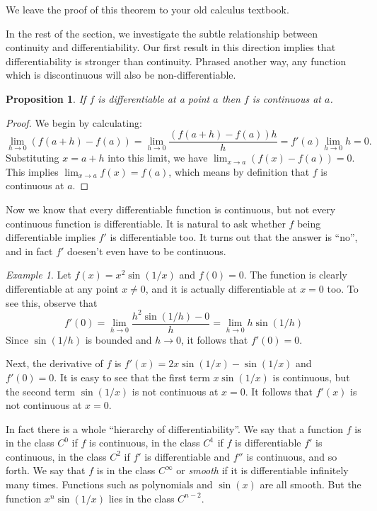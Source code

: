 \documentclass[11pt,oneside]{amsbook}
\theoremstyle{definition}
\theoremstyle{plain}
\newtheorem{proposition}[theorem]{Proposition}
\theoremstyle{definition}
\theoremstyle{remark}
\newtheorem{example}[theorem]{Example}
\numberwithin{equation}{section}
\numberwithin{figure}{section}
\begin{document}
We leave the proof of this theorem to your old calculus textbook.

In the rest of the section, we investigate the subtle relationship between continuity and differentiability. Our first result in this direction implies that differentiability is stronger than continuity. Phrased another way, any function which is discontinuous will also be non-differentiable.

\begin{proposition}
  If $f$ is differentiable at a point $a$ then $f$ is continuous at $a$.
\end{proposition}

\begin{proof}
  We begin by calculating:
  \[\lim_{h\to 0}(f(a+h)-f(a))=\lim_{h\to 0}\frac{(f(a+h)-f(a))h}{h}
    =f'(a)\lim_{h\to 0}h=0\text{.}
  \]
  Substituting $x=a+h$ into this limit, we have $\lim_{x\to a}(f(x)-f(a))=0$. This implies $\lim_{x\to a}f(x)=f(a)$, which means by definition that $f$ is continuous at $a$.
\end{proof}

Now we know that every differentiable function is continuous, but not every continuous function is differentiable. It is natural to ask whether $f$ being differentiable implies $f'$ is differentiable too. It turns out that the answer is ``no'', and in fact $f'$ doesen't even have to be continuous.

\begin{example}
  Let $f(x)=x^2\sin(1/x)$ and $f(0)=0$. The function is clearly differentiable at any point $x\neq0$, and it is actually differentiable at $x=0$ too. To see this, observe that
\[f'(0)=\lim_{h\to0}\frac{h^2\sin(1/h)-0}{h}=\lim_{h\to0}h\sin(1/h)
\]
Since $\sin(1/h)$ is bounded and $h\to 0$, it follows that $f'(0)=0$.

Next, the derivative of $f$ is $f'(x)=2x\sin(1/x)-\sin(1/x)$ and $f'(0)=0$. It is easy to see that the first term $x\sin(1/x)$ is continuous, but the second term $\sin(1/x)$ is not continuous at $x=0$. It follows that $f'(x)$ is not continuous at $x=0$.
\end{example}

In fact there is a whole ``hierarchy of differentiability''. We say that a function $f$ is in the class $C^0$ if $f$ is continuous, in the class $C^1$ if $f$ is differentiable $f'$ is continuous, in the class $C^2$ if $f'$ is differentiable and $f''$ is continuous, and so forth. We say that $f$ is in the class $C^\infty$ or \emph{smooth} if it is differentiable infinitely many times. Functions such as polynomials and $\sin(x)$ are all smooth. But the function $x^n\sin(1/x)$ lies in the class $C^{n-2}$.
\end{document}
